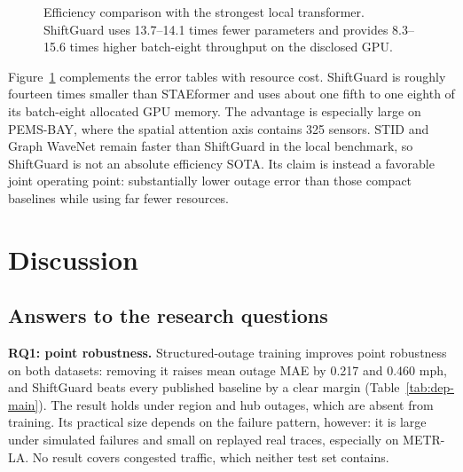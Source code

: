 \documentclass[preprint,12pt]{elsarticle}
\begin{document}
\begin{figure}[!htbp]
  \centering
  \caption{Efficiency comparison with the strongest local transformer.
  ShiftGuard uses 13.7--14.1 times fewer parameters and provides 8.3--15.6
  times higher batch-eight throughput on the disclosed GPU.}
  \label{fig:efficiency-tradeoff}
\end{figure}

Figure~\ref{fig:efficiency-tradeoff} complements the error tables with resource
cost. ShiftGuard is roughly fourteen times smaller than STAEformer and uses
about one fifth to one eighth of its batch-eight allocated GPU memory. The
advantage is especially large on PEMS-BAY, where the spatial attention axis
contains 325 sensors. STID and Graph WaveNet remain faster than ShiftGuard in
the local benchmark, so ShiftGuard is not an absolute efficiency SOTA. Its
claim is instead a favorable joint operating point: substantially lower outage
error than those compact baselines while using far fewer resources.

\FloatBarrier
\section{Discussion}
\subsection{Answers to the research questions}
\textbf{RQ1: point robustness.} Structured-outage training improves point robustness
on both datasets: removing it raises mean outage MAE by 0.217 and 0.460 mph, and
ShiftGuard beats every published baseline by a clear margin
(Table~\ref{tab:dep-main}). The result holds under region and hub outages, which
are absent from training. Its practical size depends on the failure pattern,
however: it is large under simulated failures and small on replayed real traces,
especially on METR-LA. No result covers congested traffic, which neither test set
contains.
\end{document}
